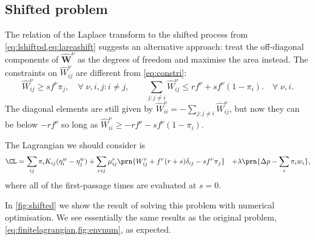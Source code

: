 \documentclass[12pt]{article}
\newcommand{\eqm}{\pi}
\newcommand{\etwm}{\eta^w}
\newcommand{\wm}{w}
\newcommand{\Wm}{W}
\newcommand{\W}{\mathbf{\Wm}}
\newcommand{\encm}{K}
\newcommand{\kktm}{\mu}
\newcommand{\shift}[1]{\widehat{#1}}
\begin{document}

\subsection{Shifted problem}\label{sec:lshift}

The relation of the Laplace transform to the shifted process from \cref{eq:lshiftpd,eq:lareashift} suggests an alternative approach: 
treat the off-diagonal components of \(\shift{\W}^\nu \) as the degrees of freedom and maximise the area instead.
The constraints on \(\shift{\Wm}^\nu_{ij}\) are different from \cref{eq:constri}:
%
\begin{equation}\label{eq:lshiftconstr}
  \shift{\Wm}^\nu_{ij} \geq s f^\nu \eqm_j,
    \quad \forall \; \nu, i, j : i \neq j, \qquad
  \sum_{j: j \neq i} \shift{\Wm}^\nu_{ij} \leq r f^\nu + s f^\nu (1 - \eqm_i).
    \quad \forall \; \nu, i.
\end{equation}
%
The diagonal elements are still given by \( \shift{\Wm}^\nu_{ii} = - \sum_{j: j \neq i} \shift{\Wm}^\nu_{ij} \), but now they can be below \(-r f^\nu \) so long as \(\shift{\Wm}^\nu_{ii} \geq -r f^\nu - s f^\nu (1 - \eqm_i)\).

The Lagrangian we should consider is
%
\begin{equation}\label{eq:lshiftlagrangian}
\begin{aligned}
  \CL =&\, \sum_{ij} \eqm_i \encm_{ij} (\etwm_i - \etwm_j)
        +\sum_{\nu i j} \kktm^\nu_{ij}\prn{\Wm^\nu_{ij} + f^\nu (r + s) \delta_{ij} -  s f^\nu \eqm_j }
        &+ \lambda \prn{ \Delta p - \sum_i \eqm_i \wm_i },
\end{aligned}
\end{equation}
%
where all of the first-passage times are evaluated at \(s = 0\).

In \cref{fig:shifted} we show the result of solving this problem with numerical optimisation.
We see essentially the same results as the original problem, \cref{eq:finitelagrangian,fig:envnum}, as expected.
\end{document}
